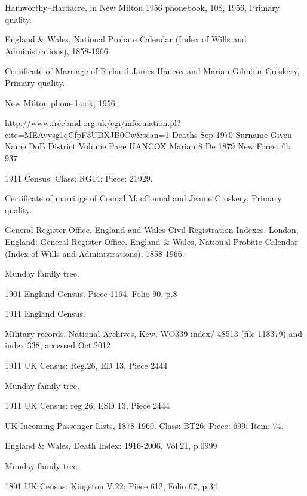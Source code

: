 \begin{thebibliography}{99}
	Hamworthy--Hardacre, in New Milton 1956 phonebook, 108, 1956, Primary quality.

	England \& Wales, National Probate Calendar (Index of Wills and Administrations), 1858-1966.

	Certificate of Marriage of Richard James Hancox and Marian Gilmour Croskery, Primary quality.

	New Milton phone book, 1956.

	\url{http://www.freebmd.org.uk/cgi/information.pl?cite=MEAyysg1qCfpF3UDXJB0Cw&scan=1}
	Deaths Sep 1970
	Surname     Given Name      DoB         District    Volume      Page
	HANCOX      Marian          8 De 1879   New Forest  6b          937

	1911 Census. Class: RG14; Piece: 21929.

	Certificate of marriage of Connal MacConnal and Jeanie Croskery, Primary quality.

	General Register Office. England and Wales Civil Registration Indexes. London, England: General Register Office.
	England \& Wales, National Probate Calendar (Index of Wills and Administrations), 1858-1966.

	Munday family tree.

	 1901 England Census. Piece 1164, Folio 90, p.8

	1911 England Census.

	Military records, National Archives, Kew.
	WO339 index/ 48513 (file 118379) and index 338, accessed Oct.2012

	1911 UK Census: Reg.26, ED 13, Piece 2444

	Munday family tree.

	1911 UK Census: reg 26, ESD 13, Piece 2444

	 UK Incoming Passenger Lists, 1878-1960. Class: BT26; Piece: 699; Item: 74.

	England \& Wales, Death Index: 1916-2006. Vol.21, p.0999

	Munday family tree.

	1891 UK Census: Kingston V.22; Piece 612, Folio 67, p.34


\end{thebibliography}
